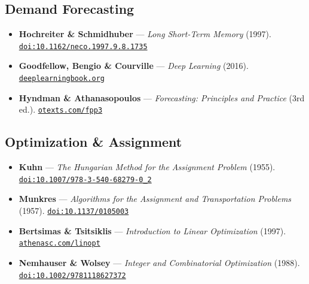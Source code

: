 \documentclass{article}
\begin{document}
\subsection*{Demand Forecasting}
\begin{itemize}
    \item \textbf{Hochreiter \& Schmidhuber} --- \textit{Long Short-Term Memory} (1997). \href{https://doi.org/10.1162/neco.1997.9.8.1735}{\nolinkurl{doi:10.1162/neco.1997.9.8.1735}}
    \item \textbf{Goodfellow, Bengio \& Courville} --- \textit{Deep Learning} (2016). \href{https://www.deeplearningbook.org/}{\nolinkurl{deeplearningbook.org}}
    \item \textbf{Hyndman \& Athanasopoulos} --- \textit{Forecasting: Principles and Practice} (3rd ed.). \href{https://otexts.com/fpp3/}{\nolinkurl{otexts.com/fpp3}}
\end{itemize}

\subsection*{Optimization \& Assignment}
\begin{itemize}
    \item \textbf{Kuhn} --- \textit{The Hungarian Method for the Assignment Problem} (1955). \href{https://doi.org/10.1007/978-3-540-68279-0_2}{\nolinkurl{doi:10.1007/978-3-540-68279-0_2}}
    \item \textbf{Munkres} --- \textit{Algorithms for the Assignment and Transportation Problems} (1957). \href{https://doi.org/10.1137/0105003}{\nolinkurl{doi:10.1137/0105003}}
    \item \textbf{Bertsimas \& Tsitsiklis} --- \textit{Introduction to Linear Optimization} (1997). \href{https://athenasc.com/linopt.html}{\nolinkurl{athenasc.com/linopt}}
    \item \textbf{Nemhauser \& Wolsey} --- \textit{Integer and Combinatorial Optimization} (1988). \href{https://doi.org/10.1002/9781118627372}{\nolinkurl{doi:10.1002/9781118627372}}
\end{itemize}
\end{document}
